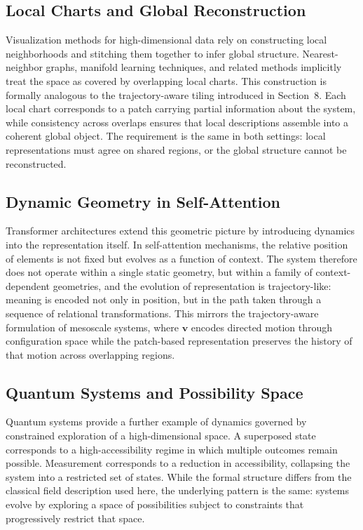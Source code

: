 \documentclass[11pt, a4paper, twocolumn]{article}
\begin{document}
\subsection{Local Charts and Global Reconstruction}

Visualization methods for high-dimensional data rely on constructing local
neighborhoods and stitching them together to infer global structure. Nearest-
neighbor graphs, manifold learning techniques, and related methods implicitly
treat the space as covered by overlapping local charts. This construction is
formally analogous to the trajectory-aware tiling introduced in Section~8.
Each local chart corresponds to a patch carrying partial information about the
system, while consistency across overlaps ensures that local descriptions
assemble into a coherent global object. The requirement is the same in both
settings: local representations must agree on shared regions, or the global
structure cannot be reconstructed.

\subsection{Dynamic Geometry in Self-Attention}

Transformer architectures extend this geometric picture by introducing dynamics
into the representation itself. In self-attention mechanisms, the relative
position of elements is not fixed but evolves as a function of context. The
system therefore does not operate within a single static geometry, but within
a family of context-dependent geometries, and the evolution of representation
is trajectory-like: meaning is encoded not only in position, but in the path
taken through a sequence of relational transformations. This mirrors the
trajectory-aware formulation of mesoscale systems, where $\mathbf{v}$ encodes
directed motion through configuration space while the patch-based representation
preserves the history of that motion across overlapping regions.

\subsection{Quantum Systems and Possibility Space}

Quantum systems provide a further example of dynamics governed by constrained
exploration of a high-dimensional space. A superposed state corresponds to a
high-accessibility regime in which multiple outcomes remain possible.
Measurement corresponds to a reduction in accessibility, collapsing the system
into a restricted set of states. While the formal structure differs from the
classical field description used here, the underlying pattern is the same:
systems evolve by exploring a space of possibilities subject to constraints
that progressively restrict that space.
\end{document}
